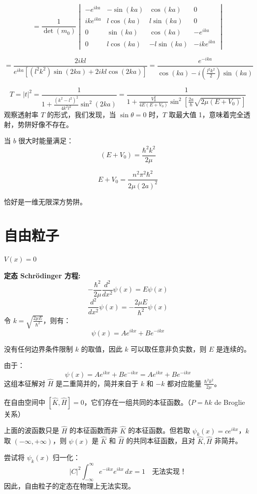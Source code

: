 \documentclass[lang=cn,10pt]{elegantbook}
\begin{document}
\[
= \frac{1}{\det(m_0)} \begin{vmatrix}
	-e^{ika} & -\sin(ka) & \cos(ka) & 0 \\
	ike^{ika} & l\cos(ka) & l\sin(ka) & 0 \\
	0 & \sin(ka) & \cos(ka) & -e^{ika} \\
	0 & l\cos(ka) & -l\sin(ka) & -ike^{ika}
\end{vmatrix}
\]

\[
= \frac{2ikl}{e^{ika} \left[ (l^2k^2) \sin(2ka) + 2ikl \cos(2ka) \right]} = \frac{e^{-ika}}{\cos(ka) - i \left( \frac{l^2k^2}{2} \right) \sin(ka)}
\]

\[
T = |t|^2 = \frac{1}{1 + \frac{(k^2 - l^2)^2}{4k^2l^2} \sin^2(2ka)} = \frac{1}{1 + \frac{V_0^2}{4E(E + V_0)} \sin^2 \left[ \frac{2a}{\hbar} \sqrt{2\mu(E + V_0)} \right]}
\]
观察透射率 \( T \) 的形式，我们发现，当 \( \sin \theta = 0 \) 时，\( T \) 取最大值 1，意味着完全透射，势阱好像不存在。

当 \( b \) 很大时能量满足：
\[
(E + V_0) = \frac{\hbar^2 k^2}{2\mu}
\]

\[
E + V_0 = \frac{n^2 \pi^2 \hbar^2}{2\mu (2a)^2}
\]

恰好是一维无限深方势阱。
\section{自由粒子}
$V(x)=0$

\textbf{定态 Schr\"{o}dinger 方程:}
\[
-\frac{\hbar^2}{2\mu} \frac{d^2}{dx^2} \psi(x) = E \psi(x)
\]
\[
\frac{d^2}{dx^2} \psi(x) = -\frac{2\mu E}{\hbar^2} \psi(x)
\]
令 \( k = \sqrt{\frac{2\mu E}{\hbar^2}} \)，则有：
\[
\psi(x) = A e^{ikx} + B e^{-ikx}
\]

没有任何边界条件限制 \( k \) 的取值，因此 \( k \) 可以取任意非负实数，则 \( E \) 是连续的。

由于：
\[
\psi(x) = A e^{ikx} + B e^{-ikx} = A e^{ikx} + B e^{-ikx}
\]
这组本征解对 \( \hat{H} \) 是二重简并的，简并来自于 \( k \) 和 \( -k \) 都对应能量 \( \frac{\hbar^2 k^2}{2\mu} \)。

在自由空间中 $[\hat{K}, \hat{H}] = 0$，它们存在一组共同的本征函数。（$P = \hbar k$ de Broglie 关系）

上面的波函数只是 $\hat{H}$ 的本征函数而非 $\hat{K}$ 的本征函数。但若取 $\psi_k(x) = c e^{ikx}$，$k$ 取 $(-\infty, +\infty)$，则 $\psi(x)$ 是 $\hat{K}$ 和 $\hat{H}$ 的共同本征函数，且对 $\hat{K}, \hat{H}$ 非简并。

尝试将 $\psi_k(x)$ 归一化：
\[
|C|^2 \int_{-\infty}^{\infty} e^{-ikx} e^{ikx} \, dx = 1 \quad \text{无法实现！}
\]
因此，自由粒子的定态在物理上无法实现。
\end{document}
